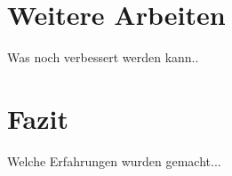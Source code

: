 \section{Weitere Arbeiten}

Was noch verbessert werden kann..

\section{Fazit}

Welche Erfahrungen wurden gemacht...
